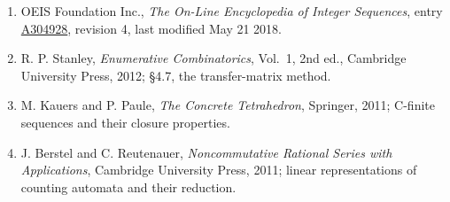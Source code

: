 \documentclass[11pt]{article}
\theoremstyle{definition}
\begin{document}
\begin{enumerate}

\item OEIS Foundation Inc., \emph{The On-Line Encyclopedia of Integer Sequences}, entry \href{https://oeis.org/A304928}{A304928}, revision 4, last modified May 21 2018.

\item R. P. Stanley, \emph{Enumerative Combinatorics}, Vol.~1, 2nd ed., Cambridge University Press, 2012; \S4.7, the transfer-matrix method.

\item M. Kauers and P. Paule, \emph{The Concrete Tetrahedron}, Springer, 2011; C-finite sequences and their closure properties.

\item J. Berstel and C. Reutenauer, \emph{Noncommutative Rational Series with Applications}, Cambridge University Press, 2011; linear representations of counting automata and their reduction.

\end{enumerate}
\end{document}
